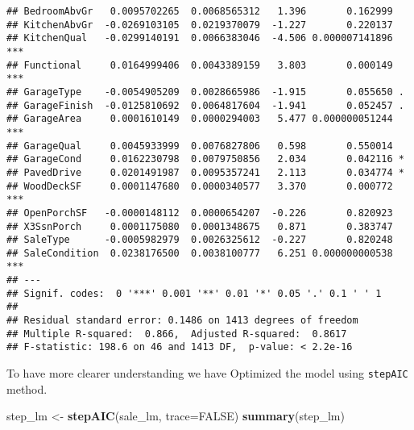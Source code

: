 \documentclass[]{article}
\newenvironment{Shaded}{\begin{snugshade}}{\end{snugshade}}
\newcommand{\DataTypeTok}[1]{\textcolor[rgb]{0.13,0.29,0.53}{#1}}
\newcommand{\KeywordTok}[1]{\textcolor[rgb]{0.13,0.29,0.53}{\textbf{#1}}}
\newcommand{\NormalTok}[1]{#1}
\newcommand{\OtherTok}[1]{\textcolor[rgb]{0.56,0.35,0.01}{#1}}
\newcommand{\StringTok}[1]{\textcolor[rgb]{0.31,0.60,0.02}{#1}}
\begin{document}
\begin{verbatim}
## BedroomAbvGr   0.0095702265  0.0068565312   1.396       0.162999    
## KitchenAbvGr  -0.0269103105  0.0219370079  -1.227       0.220137    
## KitchenQual   -0.0299140191  0.0066383046  -4.506 0.000007141896 ***
## Functional     0.0164999406  0.0043389159   3.803       0.000149 ***
## GarageType    -0.0054905209  0.0028665986  -1.915       0.055650 .  
## GarageFinish  -0.0125810692  0.0064817604  -1.941       0.052457 .  
## GarageArea     0.0001610149  0.0000294003   5.477 0.000000051244 ***
## GarageQual     0.0045933999  0.0076827806   0.598       0.550014    
## GarageCond     0.0162230798  0.0079750856   2.034       0.042116 *  
## PavedDrive     0.0201491987  0.0095357241   2.113       0.034774 *  
## WoodDeckSF     0.0001147680  0.0000340577   3.370       0.000772 ***
## OpenPorchSF   -0.0000148112  0.0000654207  -0.226       0.820923    
## X3SsnPorch     0.0001175080  0.0001348675   0.871       0.383747    
## SaleType      -0.0005982979  0.0026325612  -0.227       0.820248    
## SaleCondition  0.0238176500  0.0038100777   6.251 0.000000000538 ***
## ---
## Signif. codes:  0 '***' 0.001 '**' 0.01 '*' 0.05 '.' 0.1 ' ' 1
## 
## Residual standard error: 0.1486 on 1413 degrees of freedom
## Multiple R-squared:  0.866,  Adjusted R-squared:  0.8617 
## F-statistic: 198.6 on 46 and 1413 DF,  p-value: < 2.2e-16
\end{verbatim}

To have more clearer understanding we have Optimized the model using
\texttt{stepAIC} method.

\begin{Shaded}
\begin{Highlighting}[]
\NormalTok{step_lm <-}\StringTok{ }\KeywordTok{stepAIC}\NormalTok{(sale_lm, }\DataTypeTok{trace=}\OtherTok{FALSE}\NormalTok{)}
\KeywordTok{summary}\NormalTok{(step_lm)}
\end{Highlighting}
\end{Shaded}
\end{document}
